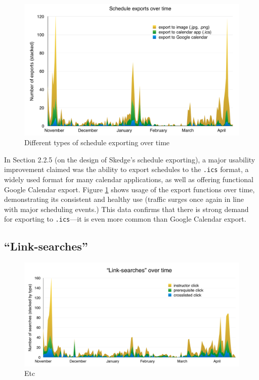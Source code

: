 \begin{figure}
  \centering
  \includegraphics[width=1.0\textwidth]{images/graph/exports}

  \caption{Different types of schedule exporting over time}
  \label{fig:exports}
\end{figure}

In Section 2.2.5 (on the design of Skedge's schedule exporting), a major usability improvement claimed was the ability to export schedules to the {\tt .ics} format, a widely used format for many calendar applications, as well as offering functional Google Calendar export. Figure \ref{fig:exports} shows usage of the export functions over time, demonstrating its consistent and healthy use (traffic surges once again in line with major scheduling events.) This data confirms that there is strong demand for exporting to {\tt .ics}---it is even more common than Google Calendar export.

\subsection{``Link-searches''}

\begin{figure}
  \centering
  \includegraphics[width=1.0\textwidth]{images/graph/linksearches}

  \caption{Etc}
  \label{fig:linksearches}
\end{figure}

